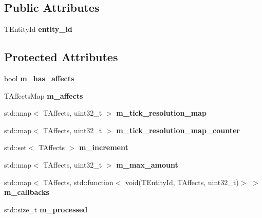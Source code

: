 \subsection*{Public Attributes}
\begin{DoxyCompactItemize}
\item 
\mbox{\label{structmods_1_1affects_1_1dissolver_a4a91e5c14d71cd2c5a0b353f799f8e64}} 
T\+Entity\+Id {\bfseries entity\+\_\+id}
\end{DoxyCompactItemize}
\subsection*{Protected Attributes}
\begin{DoxyCompactItemize}
\item 
\mbox{\label{structmods_1_1affects_1_1dissolver_a8a03e83752f5f01d294d57ec2d9e8344}} 
bool {\bfseries m\+\_\+has\+\_\+affects}
\item 
\mbox{\label{structmods_1_1affects_1_1dissolver_a976c460e0ed659d41379dca152f49078}} 
T\+Affects\+Map {\bfseries m\+\_\+affects}
\item 
\mbox{\label{structmods_1_1affects_1_1dissolver_aaba56d076ddde4721e0378830e76febd}} 
std\+::map$<$ T\+Affects, uint32\+\_\+t $>$ {\bfseries m\+\_\+tick\+\_\+resolution\+\_\+map}
\item 
\mbox{\label{structmods_1_1affects_1_1dissolver_aba2351d57a6d335183c85bf064b6e71c}} 
std\+::map$<$ T\+Affects, uint32\+\_\+t $>$ {\bfseries m\+\_\+tick\+\_\+resolution\+\_\+map\+\_\+counter}
\item 
\mbox{\label{structmods_1_1affects_1_1dissolver_a9b31e7f54820a8bbfa028f559470a4b3}} 
std\+::set$<$ T\+Affects $>$ {\bfseries m\+\_\+increment}
\item 
\mbox{\label{structmods_1_1affects_1_1dissolver_a5dfcabbe587171375039a7846a4e9c55}} 
std\+::map$<$ T\+Affects, uint32\+\_\+t $>$ {\bfseries m\+\_\+max\+\_\+amount}
\item 
\mbox{\label{structmods_1_1affects_1_1dissolver_a5232205a48c98ea423f5f96dd035bba2}} 
std\+::map$<$ T\+Affects, std\+::function$<$ void(T\+Entity\+Id, T\+Affects, uint32\+\_\+t)$>$ $>$ {\bfseries m\+\_\+callbacks}
\item 
\mbox{\label{structmods_1_1affects_1_1dissolver_a82d655e41c043ee4e96d25ac5fcbd2d2}} 
std\+::size\+\_\+t {\bfseries m\+\_\+processed}
\end{DoxyCompactItemize}


